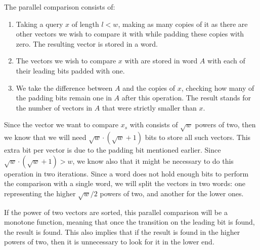 The parallel comparison consists of:
\begin{enumerate}
    \item
    Taking a query $x$ of length $l < w$, making as many copies of it as there are other vectors we wish to compare it with while padding these copies with zero. The resulting vector is stored in a word.
    
    \item
    The vectors we wish to compare $x$ with are stored in word $A$ with each of their leading bits padded with one.
    
    \item
    We take the difference between $A$ and the copies of $x$, checking how many of the padding bits remain one in $A$ after this operation. The result stands for the number of vectors in $A$ that were strictly smaller than $x$.
\end{enumerate}

Since the vector we want to compare $x_s$ with consists of $\sqrt{w}$ powers of two, then we know that we will need $\sqrt{w}\cdot(\sqrt{w} + 1)$ bits to store all such vectors. This extra bit per vector is due to the padding bit mentioned earlier. Since $\sqrt{w}\cdot(\sqrt{w} + 1) > w$, we know also that it might be necessary to do this operation in two iterations. Since a word does not hold enough bits to perform the comparison with a single word, we will split the vectors in two words: one representing the higher $\sqrt{w}/2$ powers of two, and another for the lower ones.

If the power of two vectors are sorted, this parallel comparison will be a monotone function, meaning that once the transition on the leading bit is found, the result is found. This also implies that if the result is found in the higher powers of two, then it is unnecessary to look for it in the lower end.

